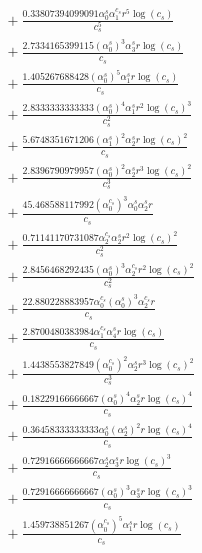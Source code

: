 \documentclass[10pt]{article}
\begin{document}
\begin{align*}
&{}  + \frac{0.33807394099091 \alpha_{0}^s \alpha_{1}^{c_s} r^{5} \log{\left(c_{s} \right)}}{c_{s}^{5}} \\
&{}  + \frac{2.7334165399115 \left(\alpha_{0}^s\right)^{3} \alpha_{3}^s r \log{\left(c_{s} \right)}}{c_{s}} \\
&{}  + \frac{1.405267688428 \left(\alpha_{0}^s\right)^{5} \alpha_{1}^s r \log{\left(c_{s} \right)}}{c_{s}} \\
&{}  + \frac{2.8333333333333 \left(\alpha_{0}^s\right)^{4} \alpha_{1}^s r^{2} \log{\left(c_{s} \right)}^{3}}{c_{s}^{2}} \\
&{}  + \frac{5.6748351671206 \left(\alpha_{1}^s\right)^{2} \alpha_{2}^s r \log{\left(c_{s} \right)}^{2}}{c_{s}} \\
&{}  + \frac{2.8396790979957 \left(\alpha_{0}^s\right)^{2} \alpha_{2}^s r^{3} \log{\left(c_{s} \right)}^{2}}{c_{s}^{3}} \\
&{}  + \frac{45.468588117992 \left(\alpha_{0}^{c_s}\right)^{3} \alpha_{0}^s \alpha_{2}^s r}{c_{s}} \\
&{}  + \frac{0.71141170731087 \alpha_{2}^{c_s} \alpha_{2}^s r^{2} \log{\left(c_{s} \right)}^{2}}{c_{s}^{2}} \\
&{}  + \frac{2.8456468292435 \left(\alpha_{0}^s\right)^{3} \alpha_{2}^{c_s} r^{2} \log{\left(c_{s} \right)}^{2}}{c_{s}^{2}} \\
&{}  + \frac{22.880228883957 \alpha_{0}^{c_s} \left(\alpha_{0}^s\right)^{3} \alpha_{2}^{c_s} r}{c_{s}} \\
&{}  + \frac{2.8700480383984 \alpha_{1}^{c_s} \alpha_{4}^s r \log{\left(c_{s} \right)}}{c_{s}} \\
&{}  + \frac{1.4438553827849 \left(\alpha_{0}^{c_s}\right)^{2} \alpha_{2}^s r^{3} \log{\left(c_{s} \right)}^{2}}{c_{s}^{3}} \\
&{}  + \frac{0.18229166666667 \left(\alpha_{0}^s\right)^{4} \alpha_{2}^s r \log{\left(c_{s} \right)}^{4}}{c_{s}} \\
&{}  + \frac{0.36458333333333 \alpha_{0}^s \left(\alpha_{2}^s\right)^{2} r \log{\left(c_{s} \right)}^{4}}{c_{s}} \\
&{}  + \frac{0.72916666666667 \alpha_{2}^s \alpha_{3}^s r \log{\left(c_{s} \right)}^{3}}{c_{s}} \\
&{}  + \frac{0.72916666666667 \left(\alpha_{0}^s\right)^{3} \alpha_{3}^s r \log{\left(c_{s} \right)}^{3}}{c_{s}} \\
&{}  + \frac{1.459738851267 \left(\alpha_{0}^{c_s}\right)^{5} \alpha_{1}^s r \log{\left(c_{s} \right)}}{c_{s}} \\

\end{align*}
\end{document}

